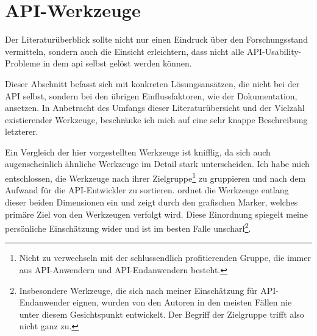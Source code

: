 \section{API-Werkzeuge}
\label{sec:api-tools}

Der Literaturüberblick sollte nicht nur einen Eindruck über den Forschungsstand vermitteln, sondern auch die Einsicht erleichtern, dass nicht alle API-Usability-Probleme in dem \gls{api} selbst gelöst werden können.

Dieser Abschnitt befasst sich mit konkreten Lösungsansätzen, die nicht bei der API selbst, sondern bei den übrigen Einflussfaktoren, wie der Dokumentation, ansetzen. In Anbetracht des Umfangs dieser Literaturübersicht und der Vielzahl existierender Werkzeuge, beschränke ich mich auf eine sehr knappe Beschreibung letzterer.

Ein Vergleich der hier vorgestellten Werkzeuge ist knifflig, da sich auch augenscheinlich ähnliche Werkzeuge im Detail stark unterscheiden. Ich habe mich entschlossen, die Werkzeuge nach ihrer Zielgruppe\footnote{Nicht zu verwechseln mit der schlussendlich profitierenden Gruppe, die immer aus API-Anwendern und API-Endanwendern besteht.} zu gruppieren und nach dem Aufwand für die API-Entwickler zu sortieren.  ordnet die Werkzeuge entlang dieser beiden Dimensionen ein und zeigt durch den grafischen Marker, welches primäre Ziel von den Werkzeugen verfolgt wird. Diese Einordnung spiegelt meine persönliche Einschätzung wider und ist im besten Falle unscharf\footnote{Insbesondere Werkzeuge, die sich nach meiner Einschätzung für API-Endanwender eignen, wurden von den Autoren in den meisten Fällen nie unter diesem Gesichtspunkt entwickelt. Der Begriff der Zielgruppe trifft also nicht ganz zu.}.

